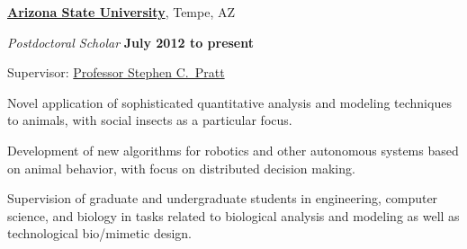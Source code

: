 \documentclass[10pt]{article}
\newcommand{\halfblankline}{\quad\vspace{-0.5\baselineskip}\pagebreak[3]}
\begin{document}
\href{http://www.asu.edu/}{\textbf{Arizona State University}},
Tempe, AZ
\begin{outerlist}

    \item[] \textit{Postdoctoral Scholar}%
            \hfill \textbf{July 2012 to present}
            \begin{innerlist}
                \item Supervisor:
                        \href{http://www.public.asu.edu/~spratt1/}%
                             {Professor Stephen C.~Pratt}

                \item Novel application of sophisticated quantitative
                    analysis and modeling techniques to animals, with
                    social insects as a particular focus.

                \item Development of new algorithms for robotics and
                    other autonomous systems based on animal behavior,
                    with focus on distributed decision making.

                \item Supervision of graduate and undergraduate students
                    in engineering, computer science, and biology in
                    tasks related to biological analysis and modeling as
                    well as technological bio\-/mimetic design.
            \end{innerlist}

\end{outerlist}

\halfblankline
\end{document}
